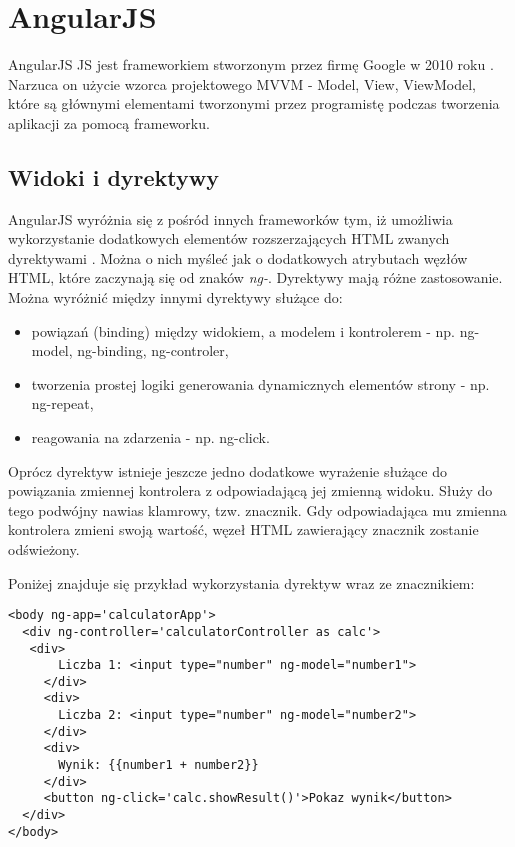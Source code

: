 \section{AngularJS}

AngularJS JS jest frameworkiem stworzonym przez firmę Google w 2010 roku \cite{angular-book}. Narzuca on użycie wzorca projektowego MVVM - Model, View, ViewModel, które są głównymi elementami tworzonymi przez programistę podczas tworzenia aplikacji za pomocą frameworku. 

\subsection{Widoki i dyrektywy}
AngularJS wyróżnia się z pośród innych frameworków tym, iż umożliwia wykorzystanie dodatkowych elementów rozszerzających HTML zwanych dyrektywami \cite{angular-book}. Można o nich myśleć jak o dodatkowych atrybutach węzłów HTML, które zaczynają się od znaków \textit{ng-}. Dyrektywy mają różne zastosowanie. Można wyróżnić między innymi dyrektywy służące do:
\begin{itemize}
\item powiązań (binding) między widokiem, a modelem i kontrolerem - np. ng-model, ng-binding, ng-controler,
\item tworzenia prostej logiki generowania dynamicznych elementów strony - np. ng-repeat,
\item reagowania na zdarzenia - np. ng-click.
\end{itemize}

Oprócz dyrektyw istnieje jeszcze jedno dodatkowe wyrażenie służące do powiązania zmiennej kontrolera z odpowiadającą jej zmienną widoku. Służy do tego podwójny nawias klamrowy, tzw. znacznik. Gdy odpowiadająca mu zmienna kontrolera zmieni swoją wartość, węzeł HTML zawierający znacznik zostanie odświeżony.

Poniżej znajduje się przykład wykorzystania dyrektyw wraz ze znacznikiem:

\begin{lstlisting}[language=HTML5]
<body ng-app='calculatorApp'>
  <div ng-controller='calculatorController as calc'>
   <div>
       Liczba 1: <input type="number" ng-model="number1">
     </div>
     <div>
       Liczba 2: <input type="number" ng-model="number2">
     </div>
     <div>
       Wynik: {{number1 + number2}}
     </div>
     <button ng-click='calc.showResult()'>Pokaz wynik</button>
  </div>
</body>
\end{lstlisting}

